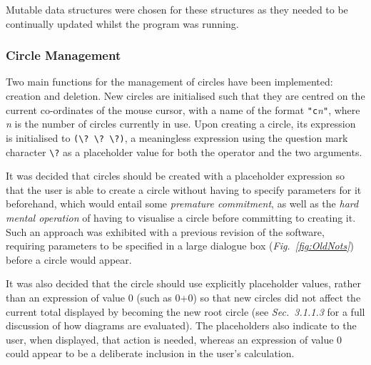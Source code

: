 \documentclass[12pt,twoside,notitlepage,xetex]{report}
\begin{document}
Mutable data structures were chosen for these structures as they needed to be continually updated whilst the program was running.

%
\subsubsection{Circle Management}

Two main functions for the management of circles have been implemented: creation and deletion.  New circles are initialised such that they are centred on the current co-ordinates of the mouse cursor, with a name of the format \verb¬"c¬\emph{n}\verb¬"¬, where \emph{n} is the number of circles currently in use.  Upon creating a circle, its expression is initialised to \verb¬(\? \? \?)¬, a meaningless expression using the question mark character \verb¬\?¬ as a placeholder value for both the operator and the two arguments.

It was decided that circles should be created with a placeholder expression so that the user is able to create a circle without having to specify parameters for it beforehand, which would entail some \emph{premature commitment}, as well as the \emph{hard mental operation} of having to visualise a circle before committing to creating it.  Such an approach was exhibited with a previous revision of the software, requiring parameters to be specified in a large dialogue box (\emph{Fig.~\ref{fig:OldNots}}) before a circle would appear.

It was also decided that the circle should use explicitly placeholder values, rather than an expression of value 0 (such as 0+0) so that new circles did not affect the current total displayed by becoming the new root circle (see \emph{Sec.~3.1.1.3} for a full discussion of how diagrams are evaluated).  The placeholders also indicate to the user, when displayed, that action is needed, whereas an expression of value 0 could appear to be a deliberate inclusion in the user's calculation.
\end{document}
